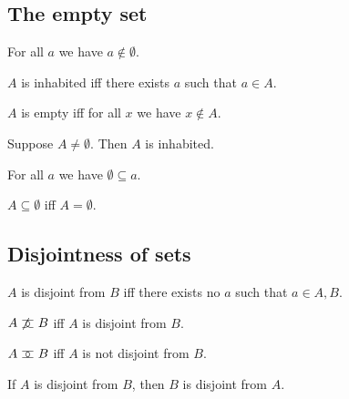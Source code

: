 \subsection{The empty set}

\begin{axiom}\label{emptyset}
    For all $a$ we have $a\notin\emptyset$.
\end{axiom}

\begin{abbreviation}\label{inhabited}
    $A$ is inhabited iff
    there exists $a$ such that $a\in A$.
\end{abbreviation}

\begin{abbreviation}\label{empty}
    $A$ is empty iff for all $x$ we have $x\notin A$.
\end{abbreviation}

\begin{proposition}\label{nonempty_inhabited}
    Suppose $A\neq\emptyset$. Then $A$ is inhabited.
\end{proposition}

\begin{proposition}\label{emptyset_subseteq}
    For all $a$ we have $\emptyset \subseteq a$.
\end{proposition}

\begin{proposition}%
\label{subseteq_emptyset_iff}
    $A\subseteq \emptyset$ iff $A = \emptyset$.
\end{proposition}


\subsection{Disjointness of sets}

\begin{definition}\label{disjoint}
    $A$ is disjoint from $B$ iff there exists no $a$ such that $a\in A, B$.
\end{definition}

\begin{abbreviation}\label{notmeets}
    $A\mathrel{\not\mathrel{\supset\!\!\!\subset}} B$ iff $A$ is disjoint from $B$.
\end{abbreviation}

\begin{abbreviation}\label{meets}
    $A\mathrel{\supset\!\!\!\subset} B$ iff $A$ is not disjoint from $B$.
\end{abbreviation}

\begin{proposition}%
\label{disjoint_symmetric}
    If $A$ is disjoint from $B$, then $B$ is disjoint from $A$.
\end{proposition}






